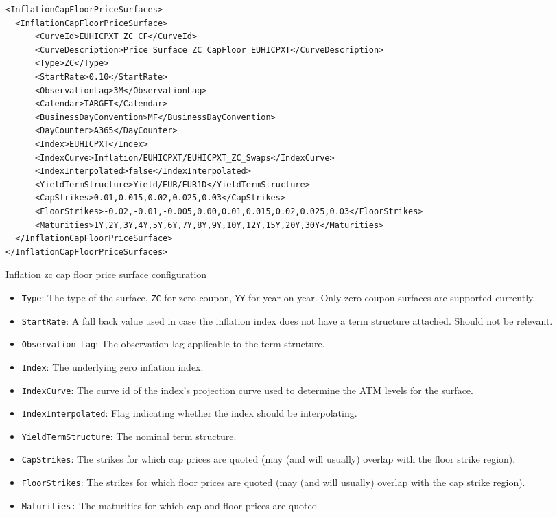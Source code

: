 \documentclass[12pt, a4paper]{article}
\newenvironment{longlisting}{\captionsetup{type=listing}}{}
\begin{document}
\begin{longlisting}
\begin{verbatim}
<InflationCapFloorPriceSurfaces>
  <InflationCapFloorPriceSurface>
      <CurveId>EUHICPXT_ZC_CF</CurveId>
      <CurveDescription>Price Surface ZC CapFloor EUHICPXT</CurveDescription>
      <Type>ZC</Type>
      <StartRate>0.10</StartRate>
      <ObservationLag>3M</ObservationLag>
      <Calendar>TARGET</Calendar>
      <BusinessDayConvention>MF</BusinessDayConvention>
      <DayCounter>A365</DayCounter>
      <Index>EUHICPXT</Index>
      <IndexCurve>Inflation/EUHICPXT/EUHICPXT_ZC_Swaps</IndexCurve>
      <IndexInterpolated>false</IndexInterpolated>
      <YieldTermStructure>Yield/EUR/EUR1D</YieldTermStructure>
      <CapStrikes>0.01,0.015,0.02,0.025,0.03</CapStrikes>
      <FloorStrikes>-0.02,-0.01,-0.005,0.00,0.01,0.015,0.02,0.025,0.03</FloorStrikes>
      <Maturities>1Y,2Y,3Y,4Y,5Y,6Y,7Y,8Y,9Y,10Y,12Y,15Y,20Y,30Y</Maturities>
  </InflationCapFloorPriceSurface>
</InflationCapFloorPriceSurfaces>
\end{verbatim}
\caption{Inflation zc cap floor price surface configuration}
\label{lst:inflationcapfloorpricesurface_configuration}
\end{longlisting}

\begin{itemize}
\item {\tt Type}: The type of the surface, {\tt ZC} for zero coupon, {\tt YY} for year on year. Only zero coupon
  surfaces are supported currently.
\item {\tt StartRate}: A fall back value used in case the inflation index does not have a term structure
  attached. Should not be relevant.
\item {\tt Observation Lag}: The observation lag applicable to the term structure.
\item {\tt Index}: The underlying zero inflation index.
\item {\tt IndexCurve}: The curve id of the index's projection curve used to determine the ATM levels for the surface.
\item {\tt IndexInterpolated}: Flag indicating whether the index should be interpolating.
\item {\tt YieldTermStructure}: The nominal term structure.
\item {\tt CapStrikes}: The strikes for which cap prices are quoted (may (and will usually) overlap with the floor
  strike region).
\item {\tt FloorStrikes}: The strikes for which floor prices are quoted (may (and will usually) overlap with the cap
  strike region).
\item {\tt Maturities:} The maturities for which cap and floor prices are quoted
\end{itemize}
\end{document}
